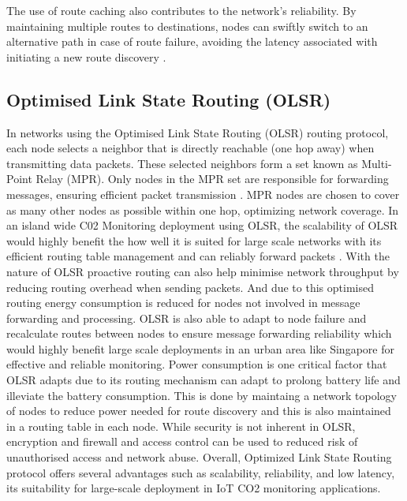The use of route caching also contributes to the network's reliability. By maintaining multiple routes to destinations, nodes can swiftly switch to an alternative path in case of route failure, avoiding the latency associated with initiating a new route discovery \cite{1431308}.

\subsection*{Optimised Link State Routing (OLSR)}

In networks using the Optimised Link State Routing (OLSR) routing protocol, each node selects a neighbor that is directly reachable (one hop away) when transmitting data packets. These selected neighbors form a set known as Multi-Point Relay (MPR). Only nodes in the MPR set are responsible for forwarding messages, ensuring efficient packet transmission\cite{Kakade2017Performance} \cite{OLSR_IETF}. MPR nodes are chosen to cover as many other nodes as possible within one hop, optimizing network coverage\cite{Ahn2014}. 
In an island wide C02  Monitoring deployment using OLSR, the scalability of OLSR would highly benefit the how well it is suited for large scale networks with its efficient routing table management and can reliably forward packets . 
With the nature of OLSR proactive routing can also help minimise network throughput by reducing routing overhead when sending packets. And due to this optimised routing energy consumption is reduced for nodes not involved in message forwarding and processing\cite{Guo_2011}.
OLSR is also able to adapt to node failure and recalculate routes between nodes to ensure message forwarding reliability which would highly benefit large scale deployments in an urban area like Singapore for effective and reliable monitoring.
Power consumption is one critical factor that OLSR adapts due to its routing mechanism can adapt to prolong battery life and illeviate the battery consumption\cite{Jubair_2019}. This is done by maintaing a network topology of nodes to reduce power needed for route discovery and this is also maintained in a routing table in each node.
While security is not inherent in OLSR, encryption and firewall and access control can be used to reduced risk of unauthorised access and network abuse.
Overall, Optimized Link State Routing protocol offers several advantages such as scalability, reliability, and low latency, its suitability for large-scale deployment in IoT CO2 monitoring applications.








